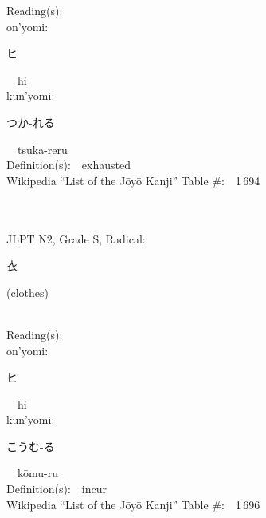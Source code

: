 \begin{multicols}{2}
Reading(s):\ \ \\
{\hspace*{1em}}on'yomi:\ \ \\
{\hspace*{2em}}{\begin{CJK}{UTF8}{min} ヒ \end{CJK}}\ \ hi\ \ \\
{\hspace*{1em}}kun'yomi:\ \ \\
{\hspace*{2em}}{\begin{CJK}{UTF8}{min} つか-れる \end{CJK}}\ \ tsuka-reru\ \ \\
Definition(s):\ \ exhausted \\
Wikipedia ``List of the J\=oy\=o Kanji'' Table \#:\ \ 1\,694 \\
\ \ \\
{\fontsize{34pt}{40pt}  }\ \ \\  %
{JLPT N2, Grade S, Radical:\ \ {\begin{CJK}{UTF8}{min} 衣 \end{CJK}} (clothes) } \\
Reading(s):\ \ \\
{\hspace*{1em}}on'yomi:\ \ \\
{\hspace*{2em}}{\begin{CJK}{UTF8}{min} ヒ \end{CJK}}\ \ hi\ \ \\
{\hspace*{1em}}kun'yomi:\ \ \\
{\hspace*{2em}}{\begin{CJK}{UTF8}{min} こうむ-る \end{CJK}}\ \ k\=omu-ru\ \ \\
Definition(s):\ \ incur \\
Wikipedia ``List of the J\=oy\=o Kanji'' Table \#:\ \ 1\,696 \\
\ \ \\
{\fontsize{34pt}{40pt}  }\ \ \\  %

\end{multicols}
